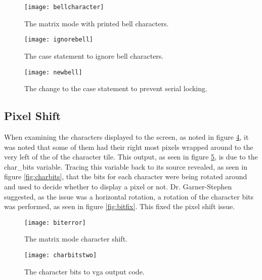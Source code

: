 \begin{figure}
  \centering
  \texttt{[image: bellcharacter]}
  \caption{The matrix mode with printed bell characters.}
  \label{fig:bellcharacter}
\end{figure}

\begin{figure}
  \centering
  \texttt{[image: ignorebell]}
  \caption{The case statement to ignore bell characters.}
  \label{fig:ignorebell}
\end{figure}

\begin{figure}
  \centering
  \texttt{[image: newbell]}
  \caption{The change to the case statement to prevent serial locking.}
  \label{fig:newbell}
\end{figure}


\subsection{Pixel Shift}

\label{Ch5 Sec3 Sub3}

When examining the characters displayed to the screen, as noted in figure \ref{fig:biterror}, it was noted that some of them had their right most pixels wrapped around to the very left of the of the character tile. This output, as seen in figure \ref{fig:charbitstwo}, is due to the char\_bits variable. Tracing this variable back to its source revealed, as seen in figure \ref{fig:charbits}, that the bits for each character were being rotated around and used to decide whether to display a pixel or not. Dr. Garner-Stephen suggested, as the issue was a horizontal rotation, a rotation of the character bits was performed, as seen in figure \ref{fig:bitfix}. This fixed the pixel shift issue.

\begin{figure}
  \centering
  \texttt{[image: biterror]}
  \caption{The matrix mode character shift.}
  \label{fig:biterror}
\end{figure}

\begin{figure}
  \centering
  \texttt{[image: charbitstwo]}
  \caption{The character bits to vga output code.}
  \label{fig:charbitstwo}
\end{figure}

